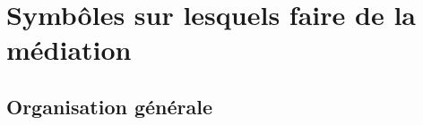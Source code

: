 

\section{Symbôles sur lesquels faire de la médiation}
\label{section:simterpose}

\subsection{Organisation générale}

